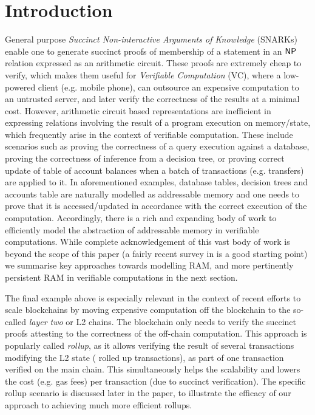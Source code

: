 \documentclass[sigconf]{acmart}
\begin{document}
\section{Introduction}\label{sec:introduction}
General purpose {\em Succinct Non-interactive Arguments of Knowledge} (SNARKs) enable one to generate succinct
proofs of membership of a statement in an $\mathsf{NP}$ relation expressed as an arithmetic circuit. These proofs are
extremely cheap to verify, which makes them useful for {\em Verifiable Computation} (VC), where a low-powered
client (e.g. mobile phone), can outsource an expensive computation to an untrusted server, and later
verify the correctness of the results at a minimal cost.
However,
arithmetic circuit based representations are inefficient in expressing relations involving the result of
a program execution on memory/state, which frequently arise in the context of verifiable computation.
These include scenarios such as proving the correctness of a query execution against a database,
proving the correctness of inference
from a decision tree, or proving correct update of table of account balances when a batch of transactions (e.g. transfers)
are applied to it.
In aforementioned examples, database tables, decision trees and accounts table are naturally
modelled as addressable memory and one needs to prove that it is accessed/updated in accordance with the correct execution
of the computation. Accordingly, there is a rich and expanding body of work to efficiently model the abstraction of
addressable memory in verifiable computations. While complete acknowledgement of this vast body of work is beyond
the scope of this paper (a fairly recent survey in \cite{WB15} is a good starting point) we summarise key approaches towards modelling RAM, and more pertinently persistent RAM
in verifiable computations in the next section.


The final example above is especially relevant in the context of recent efforts to scale blockchains
by moving expensive computation off the blockchain to the so-called {\em layer two} or L2 chains. The blockchain
only needs to verify the succinct proofs attesting to the correctness of the off-chain computation. This approach
is popularly called {\em rollup}, as it allows verifying the result of several transactions modifying the L2 state (
rolled up transactions), as part of one transaction verified on the main chain. This simultaneously helps the scalability
and lowers the cost (e.g. gas fees) per transaction (due to succinct verification). The specific rollup scenario
is discussed later in the paper, to illustrate the efficacy of our approach to achieving much more efficient rollups.
\end{document}
